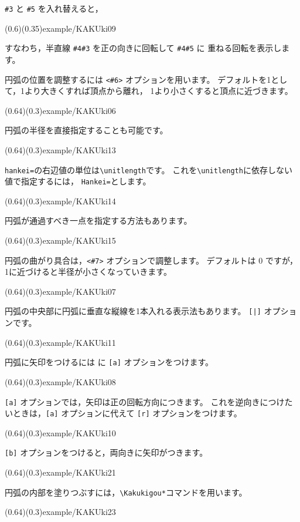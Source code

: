 \verb+#3+ と \verb+#5+ を入れ替えると，

\showexample[角の向き](0.6)(0.35){example/KAKUki09}

すなわち，半直線 \verb+#4#3+ を正の向きに回転して \verb+#4#5+ に
重ねる回転を表示します。

円弧の位置を調整するには \verb+<#6>+ オプションを用います。
デフォルトを1として，1より大きくすれば頂点から離れ，
1より小さくすると頂点に近づきます。

\showexample[円弧の位置](0.64)(0.3){example/KAKUki06}

円弧の半径を直接指定することも可能です。

\showexample[円弧の半径指定](0.64)(0.3){example/KAKUki13}

\verb/hankei=/の右辺値の単位は\verb/\unitlength/です。
これを\verb/\unitlength/に依存しない値で指定するには，
\verb/Hankei=/とします。

(0.64)(0.3){example/KAKUki14}

円弧が通過すべき一点を指定する方法もあります。

\showexample[円弧の通過点指定](0.64)(0.3){example/KAKUki15}

円弧の曲がり具合は，\verb+<#7>+ オプションで調整します。
デフォルトは 0 ですが，1に近づけると半径が小さくなっていきます。

(0.64)(0.3){example/KAKUki07}

円弧の中央部に円弧に垂直な縦線を1本入れる表示法もあります。
\texttt{[|]} オプションです。

\showexample[円弧の中心に縦棒](0.64)(0.3){example/KAKUki11}

円弧に矢印をつけるには  に \verb+[a]+ オプションをつけます。

\showexample[円弧に矢印](0.64)(0.3){example/KAKUki08}

\verb+[a]+ オプションでは，矢印は正の回転方向につきます。
これを逆向きにつけたいときは，\verb+[a]+ オプションに代えて
\verb+[r]+ オプションをつけます。

\showexample[逆向きに矢印](0.64)(0.3){example/KAKUki10}

\verb+[b]+ オプションをつけると，両向きに矢印がつきます。

\showexample[両向きに矢印](0.64)(0.3){example/KAKUki21}

円弧の内部を塗りつぶすには，\verb+\Kakukigou*+コマンドを用います。

\showexample[円弧の内部を塗りつぶす](0.64)(0.3){example/KAKUki23}


